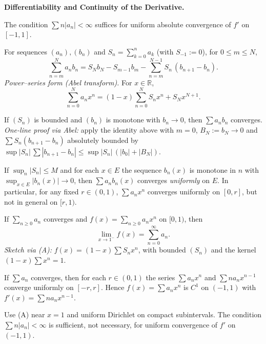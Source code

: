 \begin{problem}[CP-II-0556]
\label{prob:cp-ii-0556}
\textbf{Differentiability and Continuity of the Derivative.}

\hspace*{1.5em}The condition $\sum n|a_n|<\infty$ suffices for uniform absolute convergence of $f'$ on $[-1,1]$.

\begin{tcolorbox}[title=Abel--Dirichlet Cheat-Sheet,colback=white,colframe=black,
	fonttitle=\bfseries,boxsep=4pt,arc=2pt]

	For sequences $(a_n),(b_n)$ and $S_n=\sum_{k=0}^n a_k$ (with $S_{-1}:=0$), for $0\le m\le N$,
	\[
	\sum_{n=m}^N a_n b_n
	= S_N b_N - S_{m-1} b_m - \sum_{n=m}^{N-1} S_n\,(b_{n+1}-b_n).
	\]
	\textit{Power--series form (Abel transform).} For $x\in\mathbb R$,
	\[
	\sum_{n=0}^N a_n x^n=(1-x)\sum_{n=0}^N S_n x^n + S_N x^{N+1}. \tag{A}
	\]

	If $(S_n)$ is bounded and $(b_n)$ is monotone with $b_n\!\to\!0$, then $\sum a_n b_n$ converges.\\
	\textit{One-line proof via Abel:} apply the identity above with $m=0$, $B_N:=b_N\!\to\!0$ and
	$\sum S_n(b_{n+1}-b_n)$ absolutely bounded by $\sup|S_n|\,\sum|b_{n+1}-b_n| \le \sup|S_n|\,(|b_0|+|B_N|)$.

	If $\sup_n|S_n|\le M$ and for each $x\in E$ the sequence $b_n(x)$ is monotone in $n$ with
	$\sup_{x\in E}|b_n(x)|\to0$, then $\sum a_n b_n(x)$ converges \emph{uniformly} on $E$.
	In particular, for any fixed $r\in(0,1)$, $\sum a_n x^n$ converges uniformly on $[0,r]$, but not in general on $[r,1)$.

	If $\sum_{n\ge0} a_n$ converges and $f(x)=\sum_{n\ge0} a_n x^n$ on $[0,1)$, then
	\[
	\lim_{x\to1^-} f(x)=\sum_{n=0}^\infty a_n.
	\]
	\textit{Sketch via (A):} $f(x)=(1-x)\sum S_n x^n$, with bounded $(S_n)$ and the kernel $(1-x)\sum x^n=1$.

	If $\sum a_n$ converges, then for each $r\in(0,1)$ the series
	$\sum a_n x^n$ and $\sum n a_n x^{n-1}$ converge uniformly on $[-r,r]$.
	Hence $f(x)=\sum a_n x^n$ is $C^1$ on $(-1,1)$ with $f'(x)=\sum n a_n x^{n-1}$.

	Use (A) near $x=1$ and uniform Dirichlet on compact subintervals. The condition $\sum n|a_n|<\infty$
	is sufficient, not necessary, for uniform convergence of $f'$ on $(-1,1)$.
\end{tcolorbox}
\end{problem}

